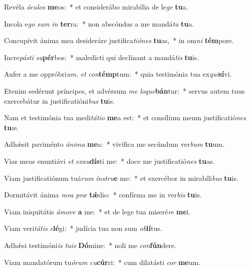 \item Revéla \textit{ó}\textit{cu}\textit{los} \textbf{me}os:~* et considerábo mirabília de le\textit{ge} \textbf{tu}a.
\item Incola e\textit{go} \textit{sum} \textit{in} \textbf{ter}ra:~* non abscóndas a me mandá\textit{ta} \textbf{tu}a.
\item Concupívit ánima mea desideráre justifica\textit{ti}\textit{ó}\textit{nes} \textbf{tu}as,~* in om\textit{ni} \textbf{tém}pore.
\item Incre\textit{pás}\textit{ti} \textit{su}\textbf{pér}bos:~* maledícti qui declínant a mandá\textit{tis} \textbf{tu}is.
\item Aufer a me oppróbri\textit{um}, \textit{et} \textit{con}\textbf{témp}tum:~* quia testimónia tua ex\textit{qui}\textbf{sí}vi.
\item Etenim sedérunt príncipes, et advérsum \textit{me} \textit{lo}\textit{que}\textbf{bán}tur:~* servus autem tuus exercebátur in justificatióni\textit{bus} \textbf{tu}is.
\item Nam et testimónia tua medi\textit{tá}\textit{ti}\textit{o} \textbf{me}a est:~* et consílium meum justificatió\textit{nes} \textbf{tu}æ.
\item Adhǽsit paviménto \textit{á}\textit{ni}\textit{ma} \textbf{me}a:~* vivífica me secúndum ver\textit{bum} \textbf{tu}um.
\item Vias meas enuntiávi \textit{et} \textit{ex}\textit{au}\textbf{dís}ti me:~* doce me justificatió\textit{nes} \textbf{tu}as.
\item Viam justificatiónum tuá\textit{rum} \textit{ín}\textit{stru}\textbf{e} me:~* et exercébor in mirabíli\textit{bus} \textbf{tu}is.
\item Dormitávit ánima \textit{me}\textit{a} \textit{præ} \textbf{tǽ}dio:~* confírma me in ver\textit{bis} \textbf{tu}is.
\item Viam iniquitátis \textit{á}\textit{mo}\textit{ve} \textbf{a} me:~* et de lege tua miseré\textit{re} \textbf{me}i.
\item Viam veri\textit{tá}\textit{tis} \textit{e}\textbf{lé}gi:~* judícia tua non sum \textit{ob}\textbf{lí}tus.
\item Adhǽsi testimóni\textit{is} \textit{tu}\textit{is} \textbf{Dó}mine:~* noli me \textit{con}\textbf{fún}dere.
\item Viam mandatórum tu\textit{ó}\textit{rum} \textit{cu}\textbf{cúr}ri:~* cum dilatásti \textit{cor} \textbf{me}um.
